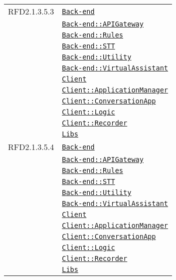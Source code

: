 \begin{longtable}{|>{\centering}m{3cm}|m{10cm}<{\centering}|}
RFD2.1.3.5.3 & \hyperref[Back-end]{\texttt{Back-end}}\\
& \hyperref[Back-end::APIGateway]{\texttt{Back-end::APIGateway}}\\
& \hyperref[Back-end::Rules]{\texttt{Back-end::Rules}}\\
& \hyperref[Back-end::STT]{\texttt{Back-end::STT}}\\
& \hyperref[Back-end::Utility]{\texttt{Back-end::Utility}}\\
& \hyperref[Back-end::VirtualAssistant]{\texttt{Back-end::VirtualAssistant}}\\
& \hyperref[Client]{\texttt{Client}}\\
& \hyperref[Client::ApplicationManager]{\texttt{Client::ApplicationManager}}\\
& \hyperref[Client::ConversationApp]{\texttt{Client::ConversationApp}}\\
& \hyperref[Client::Logic]{\texttt{Client::Logic}}\\
& \hyperref[Client::Recorder]{\texttt{Client::Recorder}}\\
& \hyperref[Libs]{\texttt{Libs}}\\ \hline

RFD2.1.3.5.4 & \hyperref[Back-end]{\texttt{Back-end}}\\
& \hyperref[Back-end::APIGateway]{\texttt{Back-end::APIGateway}}\\
& \hyperref[Back-end::Rules]{\texttt{Back-end::Rules}}\\
& \hyperref[Back-end::STT]{\texttt{Back-end::STT}}\\
& \hyperref[Back-end::Utility]{\texttt{Back-end::Utility}}\\
& \hyperref[Back-end::VirtualAssistant]{\texttt{Back-end::VirtualAssistant}}\\
& \hyperref[Client]{\texttt{Client}}\\
& \hyperref[Client::ApplicationManager]{\texttt{Client::ApplicationManager}}\\
& \hyperref[Client::ConversationApp]{\texttt{Client::ConversationApp}}\\
& \hyperref[Client::Logic]{\texttt{Client::Logic}}\\
& \hyperref[Client::Recorder]{\texttt{Client::Recorder}}\\
& \hyperref[Libs]{\texttt{Libs}}\\ \hline


\end{longtable}
